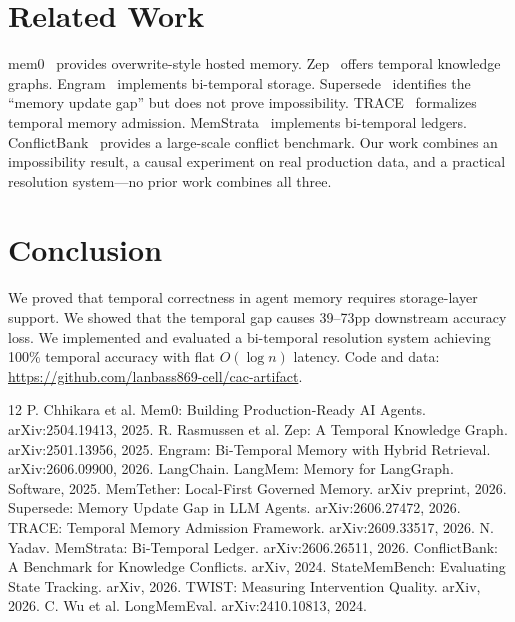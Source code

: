 \documentclass{article}
\begin{document}
\section{Related Work}
\label{sec:related}

mem0~\cite{mem0} provides overwrite-style hosted memory. Zep~\cite{zep} offers temporal knowledge graphs. Engram~\cite{engram} implements bi-temporal storage. Supersede~\cite{supersede} identifies the ``memory update gap'' but does not prove impossibility. TRACE~\cite{trace} formalizes temporal memory admission. MemStrata~\cite{memstrata} implements bi-temporal ledgers. ConflictBank~\cite{conflictbank} provides a large-scale conflict benchmark. Our work combines an impossibility result, a causal experiment on real production data, and a practical resolution system---no prior work combines all three.

\section{Conclusion}

We proved that temporal correctness in agent memory requires storage-layer support. We showed that the temporal gap causes 39--73pp downstream accuracy loss. We implemented and evaluated a bi-temporal resolution system achieving 100\% temporal accuracy with flat $O(\log n)$ latency. Code and data: \url{https://github.com/lanbass869-cell/cac-artifact}.

\begin{thebibliography}{12}
 P. Chhikara et al. Mem0: Building Production-Ready AI Agents. arXiv:2504.19413, 2025.
 R. Rasmussen et al. Zep: A Temporal Knowledge Graph. arXiv:2501.13956, 2025.
 Engram: Bi-Temporal Memory with Hybrid Retrieval. arXiv:2606.09900, 2026.
 LangChain. LangMem: Memory for LangGraph. Software, 2025.
 MemTether: Local-First Governed Memory. arXiv preprint, 2026.
 Supersede: Memory Update Gap in LLM Agents. arXiv:2606.27472, 2026.
 TRACE: Temporal Memory Admission Framework. arXiv:2609.33517, 2026.
 N. Yadav. MemStrata: Bi-Temporal Ledger. arXiv:2606.26511, 2026.
 ConflictBank: A Benchmark for Knowledge Conflicts. arXiv, 2024.
 StateMemBench: Evaluating State Tracking. arXiv, 2026.
 TWIST: Measuring Intervention Quality. arXiv, 2026.
 C. Wu et al. LongMemEval. arXiv:2410.10813, 2024.
\end{thebibliography}
\end{document}
